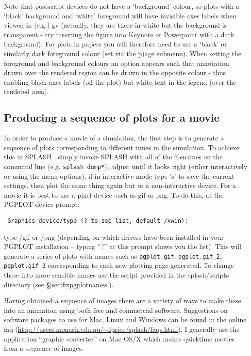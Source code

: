 \documentclass[a4paper,10pt]{article}
\newcommand{\splash}{\textsc{SPLASH }}
\begin{document}
 Note that postscript devices do not have a `background' colour, so plots with a `black' background and `white' foreground will have invisible axes labels when viewed in (e.g.) gv (actually, they are there in white but the background is transparent - try inserting the figure into Keynote or Powerpoint with a dark background). For plots in papers you will therefore need to use a `black' or similarly dark foreground colour (set via the p)age submenu). When setting the foreground and background colours an option appears such that annotation drawn over the rendered region can be drawn in the opposite colour - thus enabling black axes labels (off the plot) but white text in the legend (over the rendered area).

\subsection{Producing a sequence of plots for a movie}
\label{sec:movies} 
 In order to produce a movie of a simulation, the first step is to generate a sequence of plots corresponding to different times in the simulation. To achieve this in \splash, simply invoke \splash with all of the filenames on the command line (e.g. \verb+splash dump*+), adjust until it looks right (either interactively or using the menu options), if in interactive mode type 's' to save the current settings, then plot the same thing again but to a non-interactive device. For a movie it is best to use a pixel device such as gif or png. To do this, at the PGPLOT device prompt:
\begin{verbatim}
 Graphics device/type (? to see list, default /xwin):
\end{verbatim}
type /gif or /png (depending on which drivers have been installed in your PGPLOT installation -- typing ``?'' at this prompt shows you the list). This will generate a series of plots with names such as \verb+pgplot.gif+, \verb+pgplot.gif_2+, \verb+pgplot.gif_3+ corresponding to each new plotting page generated. To change these into more sensible names use the script provided in the splash/scripts directory (see \S\ref{sec:fixpgplotnames}). 
 
 Having obtained a sequence of images there are a variety of ways to make these into an animation using both free and commercial software. Suggestions on software packages to use for Mac, Linux and Windows can be found in the online faq (\url{http://users.monash.edu.au/~dprice/splash/faqs.html}). I generally use the application ``graphic converter'' on Mac OS/X which makes quicktime movies from a sequence of images.
 
\end{document}
